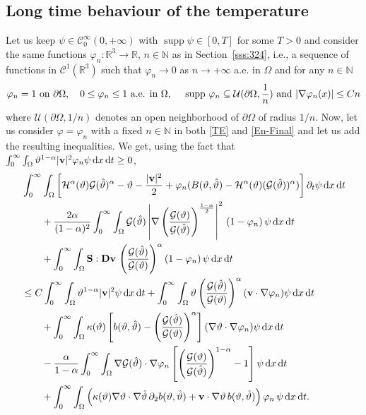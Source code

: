 \documentclass[11pt, a4paper, reqno]{amsart}
\newcommand{\N}{\mathbb N}
\newcommand{\R}{{\mathbb R}}
\numberwithin{equation}{section}
\DeclareMathOperator*{\supp}{supp}
\newcommand{\dert}{\partial_t}
\newcommand{\thetah}{\hat\thet}
\newcommand{\vc}[1]{{\bf #1}}
\newcommand{\vv}{\vc{v}}
\newcommand{\thet}{\vartheta}
\renewcommand{\S}{\mathbf{S}}
\newcommand{\D}{\mathbf{D}}
\newcommand{\dt}{\,{\rm d} t }
\newcommand{\dx}{\,{\rm d} {x}}
\newcommand{\G}{\mathcal{G}}
\newcommand{\al}{\alpha}
\newcommand{\intnO}[1]{\int_0^{\infty}\intO{ #1 }\dt}
\newcommand{\intO}[1]{\int_{\Omega} #1 \dx}
\newcommand{\bb}{b}
\newcommand{\B}{B}
\begin{document}
\subsection{Long time behaviour of the temperature}
Let us keep $\psi\in \mathcal{C}_0^\infty(0,+\infty)$ with $\supp\psi\in[0,T]$ for some $T>0$ and consider the same functions $\varphi_n:\R^3\to\R$, $n\in\N$ as in Section~\ref{sss:324}, i.e., a sequence of functions in $\mathcal{C}^1(\R^3)$ such that
$\varphi_n\to 0$ as $n\to+\infty$  a.e. in $\Omega$ and for any $n\in\N$
\begin{equation*}\begin{split}
\varphi_n=1\mbox{ on }\partial\Omega,\quad 0\leq\varphi_n\leq1 \mbox{ a.e. in } \Omega,\quad \ {\rm supp }\ \varphi_n \subseteq \mathcal{U}(\partial\Omega, \frac1n) \mbox{ and } |\nabla \varphi_n(x)|\leq Cn
\end{split}\end{equation*}
where $\mathcal{U}(\partial\Omega, {1}/{n})$ denotes an open neighborhood of $\partial\Omega$ of radius ${1}/{n}$.
Now, let us consider $\varphi=\varphi_n$ with a fixed $n\in\N$ in both \eqref{TE} and \eqref{En-Final} and let us add the resulting inequalities. We get, using the fact that $\intnO{\thet^{1-\al}|\vv|^2\varphi_n\psi}\geq 0$, 
\begin{equation}\label{dec-temp}
\begin{aligned}
     &\intnO{\left[\mathcal{H}^\al(\thet)\G(\thetah)^{\al}-\thet - \frac{|\vv|^2}{2} + \varphi_n(\B(\thet, \thetah)-\mathcal{H}^\al(\thet)(\G(\thetah))^{\al}) \right]\dert\psi} \\
     &\qquad + \frac{2\al}{(1-\al)^2}\intnO{ \G(\thetah) \left|\nabla\left(\frac{\G(\thet)}{\G(\thetah)}\right)^{\frac{1-\al}{2}}\right|^2 \,(1-\varphi_n)\,\psi}\\
&\qquad     + \intnO{  \S:\D{\vv}\,  \left(\frac{\G(\thetah)}{\G(\thet)}\right)^{\al} (1- \varphi_n)\,\psi}\\
&\leq C\intnO{\thet^{1-\al}|\vv|^2 \psi} +\intnO{\thet\left(\frac{\G(\thetah)}{\G(\thet)}\right)^{\al} (\vv  \cdot \nabla\varphi_n)\psi }\\
&\qquad +\intnO{\kappa(\thet)\left[\bb(\thet, \thetah)-\left(\frac{\G(\thetah)}{\G(\thet)}\right)^{\al} \right](\nabla\thet\cdot \nabla \varphi_n)\psi}\\
&\qquad 
-\frac{\alpha}{1-\alpha}\intnO{\nabla \G(\thetah)\cdot \nabla\varphi_n  \left[\left(\frac{\G(\thet)}{\G(\thetah)}\right)^{1-\al}-1\right] \psi}\\
&\qquad  + \intnO{\left(\kappa(\thet)\nabla\thet\cdot\nabla\thetah \,\partial_2 \bb(\thet, \thetah)+\vv\cdot\nabla \thet \,\bb(\thet, \thetah)\right)\varphi_n\, \psi }.
   \end{aligned}
 \end{equation}
\end{document}
